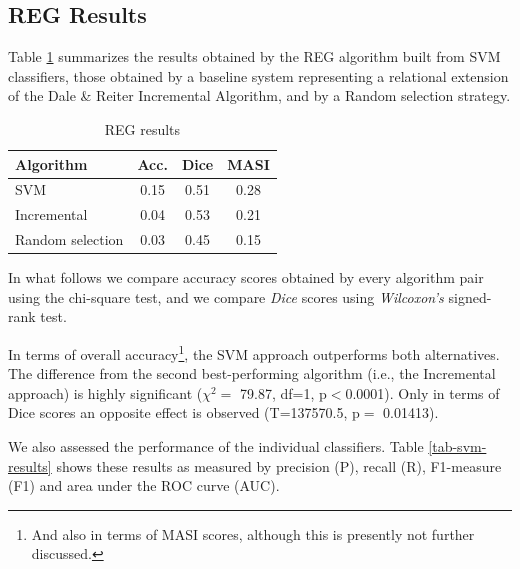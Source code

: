 \documentclass{article}
\begin{document}
\subsection{REG Results}

Table \ref{tab-reg-results} summarizes the results obtained by the REG algorithm built from SVM classifiers, those obtained by a baseline system representing a relational extension of the Dale \& Reiter Incremental Algorithm, and by a Random selection strategy.  


\begin{table}[ht]
\begin{center}
\caption{REG results}
\label{tab-reg-results}
\begin{tabular} {  l c c c }
\hline
{Algorithm}							& {Acc.} 	& { Dice}		& MASI \\ \hline 
SVM											& 0.15		&	0.51			& 0.28 \\
Incremental							& 0.04		&	0.53			& 0.21 \\
Random selection       	& 0.03    & 0.45      & 0.15 \\
\hline
\end{tabular}
\end{center}
\end{table}

In what follows we compare accuracy scores obtained by every algorithm pair using the chi-square test, and we compare {\em Dice} scores using {\em Wilcoxon's} signed-rank test.

In terms of overall accuracy\footnote{And also in terms of MASI scores, although this is presently not further discussed.}, the SVM approach outperforms both alternatives. The difference from the second best-performing algorithm (i.e., the Incremental approach) is highly significant ($\chi^{2}=$ 79.87, df=1, p$<$0.0001). Only in terms of Dice scores an opposite effect is observed (T=137570.5, p$=$ 0.01413). 

We also assessed the performance of the individual classifiers. Table \ref{tab-svm-results} shows these results as measured by precision (P), recall (R), F1-measure (F1) and area under the ROC curve (AUC). 
\end{document}
